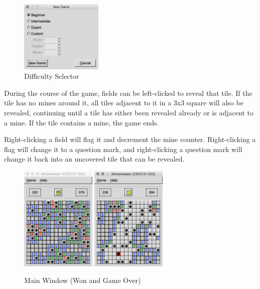 \documentclass[11pt]{article}
\begin{document}
\begin{figure}[htbp]
   \centering
   \includegraphics[width=0.35\textwidth]{newGame.png}
   \caption{Difficulty Selector}
\end{figure}

During the course of the game, fields can be left-clicked to reveal that tile. If the tile has no mines around it, all tiles adjacent to it in a 3x3 square will also be revealed, continuing until a tile has either been revealed already or is adjacent to a mine. If the tile contains a mine, the game ends.

Right-clicking a field will flag it and decrement the mine counter. Right-clicking a flag will change it to a question mark, and right-clicking a question mark will change it back into an uncovered tile that can be revealed.

\begin{figure}[htbp]
   \centering
   \includegraphics[width=0.32\textwidth]{mainWon.png}
   \includegraphics[width=0.32\textwidth]{mainGameOver.png}
   \caption{Main Window (Won and Game Over)}
\end{figure}
\end{document}
